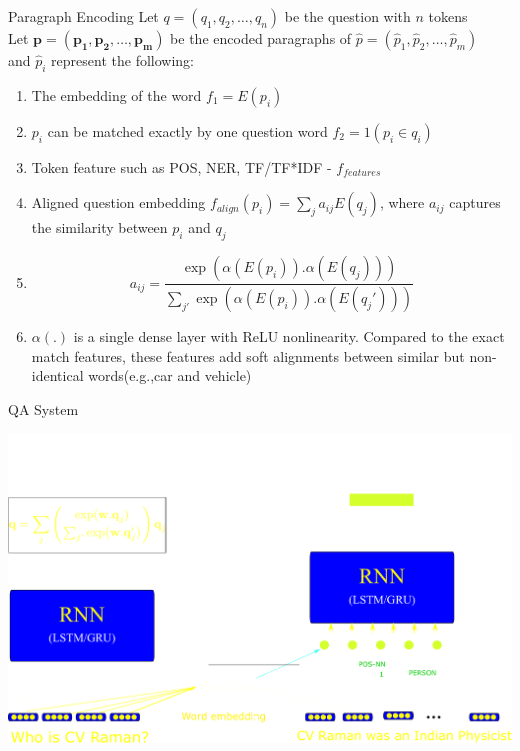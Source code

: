 \begin{frame}{Paragraph Encoding}
Let $q = (q_1,q_2,\ldots, q_n)$ be the question with $n$ tokens\\
Let $\mathbf{p} = (\mathbf{p_1},\mathbf{p_2},\dots, \mathbf{p_m})$ be the encoded paragraphs of $\hat{p} = (\hat{p}_1,\hat{p}_2,\ldots, \hat{p}_m)$\\
and $\hat{p}_i$ represent the following:
\begin{enumerate}
	\item The embedding of the word $f_1 = E(p_i)$
	\item $p_i$ can be matched exactly by one question word $f_2 = \mathfrak{1} (p_i \in q_i)$
	\item Token feature such as POS, NER, TF/TF*IDF - $f_{features}$
	\item Aligned question embedding $f_{align}(p_i) = \sum_{j}^{}a_{ij}E(q_j)$, where $a_{ij}$ captures the similarity between $p_i$ and $q_j$
	\item [] \begin{equation}
	a_{ij} = \dfrac{\exp(\alpha (E(p_i)).\alpha (E(q_j)))}{\sum_{j'}^{}\exp(\alpha (E(p_i)).\alpha (E(q_j')))}
	\end{equation}
	\item[] $\alpha(.)$ is a single dense layer with ReLU nonlinearity.   Compared  to  the exact  match features,  these  features  add  soft  alignments between   similar   but   non-identical   words(e.g.,car and vehicle)
\end{enumerate}
\end{frame}


\begin{frame}{QA System}
\begin{center}
	\includegraphics[width=0.75\linewidth]{./Images/QAEncodersV2}
\end{center}

\end{frame}



